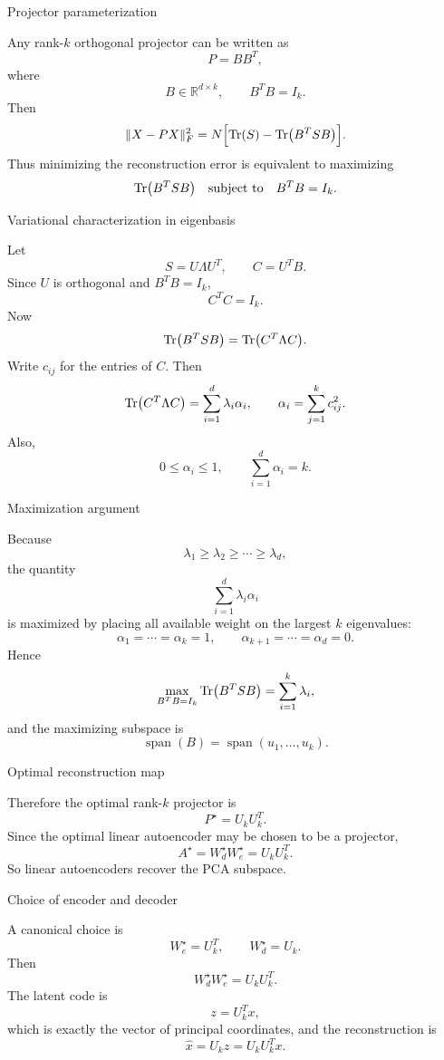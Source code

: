 \documentclass[aspectratio=169]{beamer}
\begin{document}
\begin{frame}{Projector parameterization}

Any rank-\(k\) orthogonal projector can be written as
\[
P = BB^T,
\]
where
\[
B\in\mathbb{R}^{d\times k},\qquad B^TB=I_k.
\]
Then
\[
\|X-PX\|_F^2
=
N\Bigl[\Tr(S)-\Tr(B^TSB)\Bigr].
\]
Thus minimizing the reconstruction error is equivalent to maximizing
\[
\Tr(B^TSB)
\quad \text{subject to} \quad B^TB=I_k.
\]

\end{frame}

\begin{frame}{Variational characterization in eigenbasis}

Let
\[
S = U\Lambda U^T,\qquad C = U^T B.
\]
Since \(U\) is orthogonal and \(B^TB=I_k\),
\[
C^T C = I_k.
\]
Now
\[
\Tr(B^TSB) = \Tr(C^T \Lambda C).
\]
Write \(c_{ij}\) for the entries of \(C\). Then
\[
\Tr(C^T\Lambda C)=\sum_{i=1}^d \lambda_i \alpha_i,
\qquad
\alpha_i = \sum_{j=1}^k c_{ij}^2.
\]
Also,
\[
0\le \alpha_i \le 1,\qquad \sum_{i=1}^d \alpha_i = k.
\]

\end{frame}

\begin{frame}{Maximization argument}

Because
\[
\lambda_1\ge \lambda_2\ge \cdots \ge \lambda_d,
\]
the quantity
\[
\sum_{i=1}^d \lambda_i \alpha_i
\]
is maximized by placing all available weight on the largest \(k\) eigenvalues:
\[
\alpha_1=\cdots=\alpha_k=1,\qquad \alpha_{k+1}=\cdots=\alpha_d=0.
\]
Hence
\[
\max_{B^TB=I_k}\Tr(B^TSB)=\sum_{i=1}^k \lambda_i,
\]
and the maximizing subspace is
\[
\operatorname{span}(B)=\operatorname{span}(u_1,\dots,u_k).
\]

\end{frame}

\begin{frame}{Optimal reconstruction map}

Therefore the optimal rank-\(k\) projector is
\[
P^\star = U_k U_k^T.
\]
Since the optimal linear autoencoder may be chosen to be a projector,
\[
A^\star = W_d^\star W_e^\star = U_k U_k^T.
\]
So linear autoencoders recover the PCA subspace.

\end{frame}

\begin{frame}{Choice of encoder and decoder}

A canonical choice is
\[
W_e^\star = U_k^T,\qquad W_d^\star = U_k.
\]
Then
\[
W_d^\star W_e^\star = U_k U_k^T.
\]
The latent code is
\[
z = U_k^T x,
\]
which is exactly the vector of principal coordinates, and the reconstruction is
\[
\hat x = U_k z = U_k U_k^T x.
\]

\end{frame}
\end{document}
